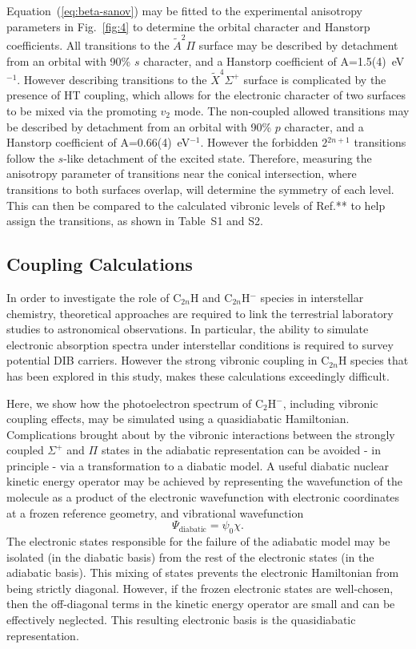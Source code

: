 \documentclass[journal=jpcafh,manuscript=article,layout=onecolumn, 12pt]{achemso}
\begin{document}
Equation~(\ref{eq:beta-sanov}) may be fitted to the experimental anisotropy parameters in Fig.~\ref{fig:4} to determine the orbital character and Hanstorp coefficients. All transitions to the $\tilde{A}^2\Pi$ surface may be described by detachment from an orbital with 90\% $s$ character, and a Hanstorp coefficient of A=1.5(4)~eV$^{-1}$. However describing transitions to the $\tilde{X}^4\Sigma^+$ surface is complicated by the presence of HT coupling, which allows for the electronic character of two surfaces to be mixed via the promoting $v_2$ mode. The non-coupled allowed transitions may be described by detachment from an orbital with 90\% $p$ character, and a Hanstorp coefficient of A=0.66(4)~eV$^{-1}$. However the forbidden 2$^{2n+1}$ transitions follow the $s$-like detachment of the excited state. Therefore, measuring the anisotropy parameter of transitions near the conical intersection, where transitions to both surfaces overlap, will determine the symmetry of each level. This can then be compared to the calculated vibronic levels of Ref.** to help assign the transitions, as shown in Table~S1 and S2.

\subsection{Coupling Calculations}
In order to investigate the role of C$_{2n}$H and C$_{2n}$H$^-$ species in interstellar chemistry, theoretical approaches are required to link the terrestrial laboratory studies to astronomical observations. In particular, the ability to simulate electronic absorption spectra under interstellar conditions is required to survey potential DIB carriers. However the strong vibronic coupling in C$_{2n}$H species that has been explored in this study, makes these calculations exceedingly difficult.

Here, we show how the photoelectron spectrum of C$_2$H$^-$, including vibronic coupling effects, may be simulated using a quasidiabatic Hamiltonian. Complications brought about by the vibronic interactions between the strongly coupled $\Sigma^+$ and $\Pi$ states in the adiabatic representation can be avoided - in principle - via a transformation to a diabatic model. A useful diabatic nuclear kinetic energy operator may be achieved by representing the wavefunction of the molecule as a product of the electronic wavefunction with electronic coordinates at a frozen reference geometry, and vibrational wavefunction
\begin{equation}
\Psi_{\text{diabatic}} = \psi_{0} \chi.
\end{equation}
The electronic states responsible for the failure of the adiabatic model may be isolated (in the diabatic basis) from the rest of the electronic states (in the adiabatic basis). This mixing of states prevents the electronic Hamiltonian from being strictly diagonal. However, if the frozen electronic states are well-chosen, then the off-diagonal terms in the kinetic
energy operator are small and can be effectively neglected. This resulting electronic basis is the quasidiabatic representation.
\end{document}
